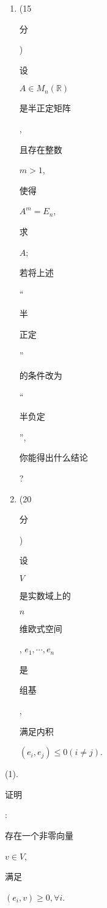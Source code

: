 \documentclass[10pt]{article}
\begin{document}
\begin{enumerate}
  \item (15 \begin{CJK}{UTF8}{mj}分\end{CJK}) \begin{CJK}{UTF8}{mj}设\end{CJK} $A \in M_{n}(\mathbb{R})$ \begin{CJK}{UTF8}{mj}是半正定矩阵\end{CJK}, \begin{CJK}{UTF8}{mj}且存在整数\end{CJK} $m>1$, \begin{CJK}{UTF8}{mj}使得\end{CJK} $A^{m}=E_{n}$, \begin{CJK}{UTF8}{mj}求\end{CJK} $A$; \begin{CJK}{UTF8}{mj}若将上述\end{CJK} “\begin{CJK}{UTF8}{mj}半\end{CJK} \begin{CJK}{UTF8}{mj}正定\end{CJK}”\begin{CJK}{UTF8}{mj}的条件改为\end{CJK} “\begin{CJK}{UTF8}{mj}半负定\end{CJK}”, \begin{CJK}{UTF8}{mj}你能得出什么结论\end{CJK}?

  \item (20 \begin{CJK}{UTF8}{mj}分\end{CJK}) \begin{CJK}{UTF8}{mj}设\end{CJK} $V$ \begin{CJK}{UTF8}{mj}是实数域上的\end{CJK} $n$ \begin{CJK}{UTF8}{mj}维欧式空间\end{CJK}, $e_{1}, \cdots, e_{n}$ \begin{CJK}{UTF8}{mj}是\end{CJK} \begin{CJK}{UTF8}{mj}组基\end{CJK}, \begin{CJK}{UTF8}{mj}满足内积\end{CJK} $\left(e_{i}, e_{j}\right) \leqslant 0(i \neq j)$.

\end{enumerate}
(1). \begin{CJK}{UTF8}{mj}证明\end{CJK}: \begin{CJK}{UTF8}{mj}存在一个非零向量\end{CJK} $v \in V$, \begin{CJK}{UTF8}{mj}满足\end{CJK} $\left(e_{i}, v\right) \geqslant 0, \forall i$.
\end{document}
